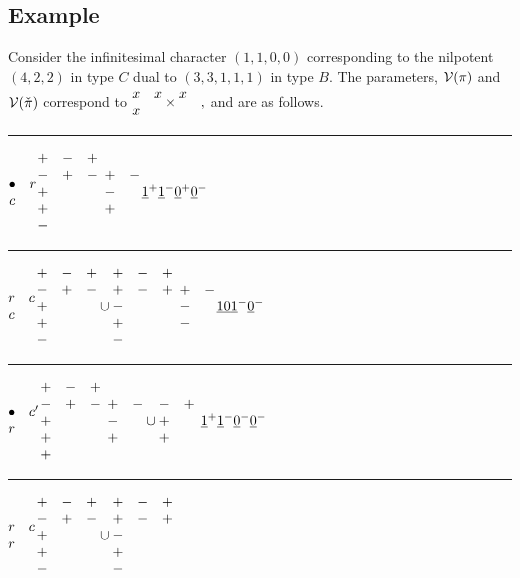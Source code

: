 \documentclass[11pt ,reqno]{amsart}
\begin{document}
\hfill
\medskip

\subsection{Example}\label{3.6} Consider the infinitesimal character
$(1,1,0,0)$ corresponding to the nilpotent $(4,2,2)$ in type $C$ dual to
$(3,3,1,1,1)$ in type $B.$ The parameters, ${\mathcal V}(\pi)$ and ${\mathcal V}({\check\pi})$  correspond to
$\begin{matrix} x&x\\x&\end{matrix}\times\begin{matrix} x&\\&\end{matrix},$  and are as follows.

\bigskip
\hrule
\medskip
$\begin{matrix} \bullet&r\\ c&\end{matrix}$\qquad  $\begin{matrix} +&-&+\\ -&+&-\\+&&\\+&&\\-&&\end{matrix}$
\qquad $\begin{matrix} +&-\\-&\\+\end{matrix}$\qquad ${\underline{1}}^+{\underline{1}}^-{\underline{0}}^+{\underline{0}}^-$
\hfill
\medskip
\hrule
\medskip
$\begin{matrix} r&c\\ c&\end{matrix}$\qquad  $\begin{matrix} +&-&+\\-&+&-\\+&&\\+&&\\-&&\end{matrix}
\cup  \begin{matrix} +&-&+\\+&-&+\\-&&\\+&&\\-&&\end{matrix}$
\qquad $\begin{matrix} +&-\\-&\\-\end{matrix}$\qquad ${\underline{10}}{\underline{1}}^-{\underline{0}}^-$\hfill
\medskip
\hrule
\medskip
$\begin{matrix} \bullet&c'\\ r&\end{matrix}$\qquad  $\begin{matrix} +&-&+\\ -&+&-\\+&&\\+&&\\+&&\end{matrix}$
\qquad $\begin{matrix} +&-\\-&\\+\end{matrix}\cup\begin{matrix} -&+\\+&\\+\end{matrix} $
\qquad ${\underline{1}}^+{\underline{1}}^-{\underline{0}}^-{\underline{0}}^-$
\hfill
\medskip
\hrule
\medskip
$\begin{matrix} r&c\\ r&\end{matrix}$\qquad  $\begin{matrix} +&-&+\\-&+&-\\+&&\\+&&\\-&&\end{matrix}
\cup  \begin{matrix} +&-&+\\+&-&+\\-&&\\+&&\\-&&\end{matrix}$
\end{document}
